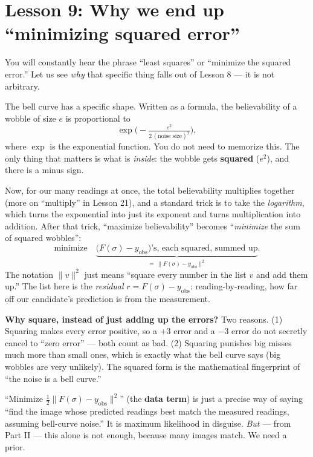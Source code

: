 \documentclass[11pt]{article}
\newcommand{\norm}[1]{\lVert #1 \rVert}
\begin{document}
\section{Lesson 9: Why we end up ``minimizing squared error''}

You will constantly hear the phrase ``least squares'' or ``minimize the
squared error.'' Let us see \emph{why} that specific thing falls out of
Lesson 8 --- it is not arbitrary.

The bell curve has a specific shape. Written as a formula, the believability
of a wobble of size $e$ is proportional to
\[
\exp\!\Big(-\tfrac{e^2}{2\,(\text{noise size})^2}\Big),
\]
where $\exp$ is the exponential function. You do not need to memorize this.
The only thing that matters is what is \emph{inside}: the wobble gets
\textbf{squared} ($e^2$), and there is a minus sign.

Now, for our many readings at once, the total believability multiplies
together (more on ``multiply'' in Lesson 21), and a standard trick is to take
the \emph{logarithm}, which turns the exponential into just its exponent and
turns multiplication into addition. After that trick, ``maximize
believability'' becomes ``\emph{minimize} the sum of squared wobbles'':
\[
\text{minimize}\quad
\underbrace{\big(F(\sigma) - y_{\text{obs}}\big)\text{'s, each squared, summed up}}_{\textstyle =\ \norm{F(\sigma)-y_{\text{obs}}}^2} .
\]
The notation $\norm{v}^2$ just means ``square every number in the list $v$ and
add them up.'' The list here is the \emph{residual} $r = F(\sigma) -
y_{\text{obs}}$: reading-by-reading, how far off our candidate's prediction is
from the measurement.

\begin{intuition}
\textbf{Why square, instead of just adding up the errors?} Two reasons.
(1) Squaring makes every error positive, so a $+3$ error and a $-3$ error do
not secretly cancel to ``zero error'' --- both count as bad. (2) Squaring
punishes big misses much more than small ones, which is exactly what the bell
curve says (big wobbles are very unlikely). The squared form is the
mathematical fingerprint of ``the noise is a bell curve.''
\end{intuition}

\begin{key}
``Minimize $\tfrac12\norm{F(\sigma)-y_{\text{obs}}}^2$'' (the \textbf{data
term}) is just a precise way of saying ``find the image whose predicted
readings best match the measured readings, assuming bell-curve noise.'' It is
maximum likelihood in disguise. \emph{But} --- from Part II --- this alone is
not enough, because many images match. We need a prior.
\end{key}
\end{document}
